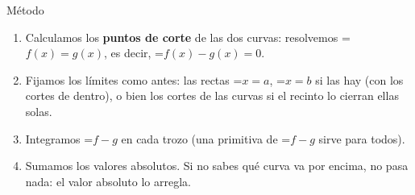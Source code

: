 \documentclass[11pt,a4paper]{article}
\newcommand{\fmm}[1]{\setbox0=\hbox{$#1$}\ifdim\wd0>\linewidth\[#1\]\else\mbox{\box0}\fi}
\begin{document}

  
\begin{fmprop}{Método}
\begin{enumerate}
\item Calculamos los \textbf{puntos de corte} de las dos curvas: resolvemos \fmm{f(x)=g(x)}, es decir, \fmm{f(x)-g(x)=0}.
\item Fijamos los límites como antes: las rectas \fmm{x=a}, \fmm{x=b} si las hay (con los cortes de dentro), o bien los cortes de las curvas si el recinto lo cierran ellas solas.
\item Integramos \fmm{f-g} en cada trozo (una primitiva de \fmm{f-g} sirve para todos).
\item Sumamos los valores absolutos. Si no sabes qué curva va por encima, no pasa nada: el valor absoluto lo arregla.
\end{enumerate}
\end{fmprop}
\end{document}
